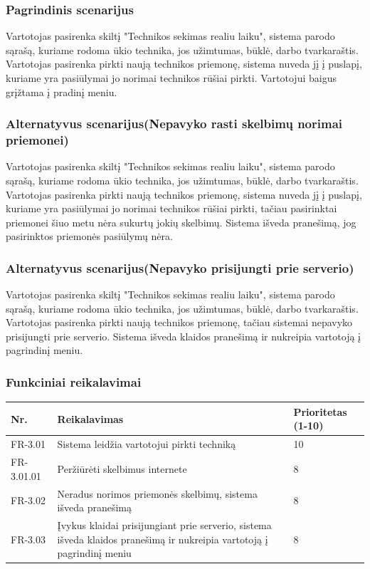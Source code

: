 \documentclass[oneside]{VUMIFPSkursinis}
\begin{document}
\subsubsection{Pagrindinis scenarijus}
	Vartotojas pasirenka skiltį "Technikos sekimas realiu laiku", sistema parodo sąrašą, kuriame rodoma ūkio technika, jos užimtumas, būklė, darbo tvarkaraštis. Vartotojas pasirenka pirkti naują technikos priemonę, sistema nuveda jį į puslapį, kuriame yra pasiūlymai jo norimai technikos rūšiai pirkti. Vartotojui baigus grįžtama į pradinį meniu.
\subsubsection{Alternatyvus scenarijus(Nepavyko rasti skelbimų norimai priemonei)}
	Vartotojas pasirenka skiltį "Technikos sekimas realiu laiku", sistema parodo sąrašą, kuriame rodoma ūkio technika, jos užimtumas, būklė, darbo tvarkaraštis. Vartotojas pasirenka pirkti naują technikos priemonę, sistema nuveda jį į puslapį, kuriame yra pasiūlymai jo norimai technikos rūšiai pirkti, tačiau pasirinktai priemonei šiuo metu nėra sukurtų jokių skelbimų. Sistema išveda pranešimą, jog pasirinktos priemonės pasiūlymų nėra.
\subsubsection{Alternatyvus scenarijus(Nepavyko prisijungti prie serverio)}
	Vartotojas pasirenka skiltį "Technikos sekimas realiu laiku", sistema parodo sąrašą, kuriame rodoma ūkio technika, jos užimtumas, būklė, darbo tvarkaraštis. Vartotojas pasirenka pirkti naują technikos priemonę, tačiau sistemai nepavyko prisijungti prie serverio. Sistema išveda klaidos pranešimą ir nukreipia vartotoją į pagrindinį meniu.
\subsubsection{Funkciniai reikalavimai}
\begin{table}[htbp]
	\begin{tabularx}{1\textwidth}{ |P{2.5cm}|X|P{3cm }| }  \hline
           	Nr. & Reikalavimas &  Prioritetas (1-10)  \\   \hline 
         	FR-3.01 & Sistema leidžia vartotojui pirkti techniką & 10  \\   \hline
		FR-3.01.01 & Peržiūrėti skelbimus internete & 8 \\ \hline
        	FR-3.02 & Neradus norimos priemonės skelbimų, sistema išveda pranešimą & 8   \\   \hline
		FR-3.03 & Įvykus klaidai prisijungiant prie serverio, sistema išveda klaidos pranešimą ir nukreipia vartotoją į pagrindinį meniu & 8 \\ \hline
	\end{tabularx}
\end{table}
\end{document}
